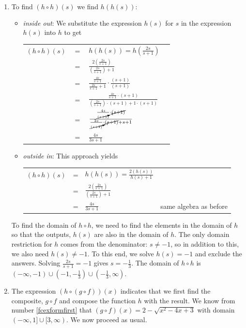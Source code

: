 \documentclass{ximera}
\begin{document}
\begin{example}
\begin{explanation}
\begin{enumerate}
\item  To find $(h \circ h)(s)$ we find $h(h(s))$:

\begin{itemize}

\item  \textit{inside out}: We substitute the expression $h(s)$ for $s$ in the expression $h(s)$ into $h$ to get
\begin{longtable}{rclr} $(h \circ h)(s)$ & $=$ & $h(h(s)) =h\left(\frac{2s}{s+1}\right)$ & \\
&=& $\frac{2\left(\frac{2s}{s+1}\right)}{\left(\frac{2s}{s+1}\right)+1}$ & \\
 & = & $\frac{\frac{4s}{s+1}}{\frac{2s}{s+1}+1} \cdot \frac{(s+1)}{(s+1)}$ & \\
& = & $\frac{\frac{4s}{s+1} \cdot (s+1)}{\left(\frac{2s}{s+1}\right)\cdot(s+1)+1\cdot(s+1)}$ & \\
& = & $\frac{\frac{4s}{\cancelto{1}{(s+1})} \cdot \cancel{(s+1)}}{\frac{2s}{\cancelto{1}{(s+1)}}\cdot\cancel{(s+1)}+s+1}$ & \\
& = & $\frac{4s}{3s+1}$ & \\ 
 \end{longtable}

\item  \textit{outside in}: This approach yields
\begin{longtable}{rclr} $(h \circ h)(s)$ & = & $h(h(s)) = \frac{2 (h(s))}{h(s) + 1}$ & \\ [.25in]
& = & $\frac{2\left(\frac{2s}{s+1}\right)}{\left(\frac{2s}{s+1}\right)+1}$ & \\[.35in] 
& = & $\frac{4s}{3s+1}$ &  same algebra as before\\
 \end{longtable}

\end{itemize}

To find the domain of $h \circ h$,  we need to find the elements in the domain of $h$ so that the outputs, $h(s)$ are also in the domain of $h$.  The only domain restriction for $h$ comes from the denominator: $s \neq -1$, so in addition to this, we also need $h(s) \neq -1$.  To this end, we solve $h(s) = -1$ and exclude the answers.  Solving   $\frac{2s}{s+1} = -1$ gives $s = -\frac{1}{3}$.  The domain of $h \circ h$ is $(-\infty, -1) \cup \left(-1, -\frac{1}{3}\right) \cup \left(-\frac{1}{3}, \infty\right)$. 

\item  The expression $(h \circ (g \circ f))(x)$ indicates that we first find the composite, $g \circ f$ and compose the function $h$ with the result.  We know from number \ref{fcexformfirst} that $(g \circ f)(x) =  2 - \sqrt{x^2-4x+3}$ with domain $(-\infty, 1] \cup [3,\infty)$.  We now proceed as usual.


\end{enumerate}
\end{explanation}
\end{example}
\end{document}
